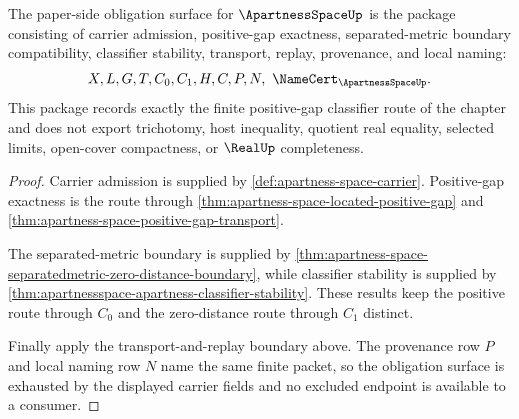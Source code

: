 \begin{theorem}
\label{thm:apartnessspace-namecert-obligation-package}
The paper-side obligation surface for $\ApartnessSpaceUp$ is the package
consisting of carrier admission, positive-gap exactness, separated-metric
boundary compatibility, classifier stability, transport, replay, provenance,
and local naming:
$$
X,L,G,T,C_0,C_1,H,C,P,N,\ \NameCert_{\ApartnessSpaceUp}.
$$
This package records exactly the finite positive-gap classifier route of the
chapter and does not export trichotomy, host inequality, quotient real
equality, selected limits, open-cover compactness, or $\RealUp$ completeness.
\end{theorem}
\begin{proof}
Carrier admission is supplied by \autoref{def:apartness-space-carrier}.
Positive-gap exactness is the route through
\autoref{thm:apartness-space-located-positive-gap} and
\autoref{thm:apartness-space-positive-gap-transport}.

The separated-metric boundary is supplied by
\autoref{thm:apartness-space-separatedmetric-zero-distance-boundary}, while
classifier stability is supplied by
\autoref{thm:apartnessspace-apartness-classifier-stability}. These results
keep the positive route through $C_0$ and the zero-distance route through
$C_1$ distinct.

Finally apply the transport-and-replay boundary above. The provenance row $P$
and local naming row $N$ name the same finite packet, so the obligation
surface is exhausted by the displayed carrier fields and no excluded endpoint
is available to a consumer.
\end{proof}

